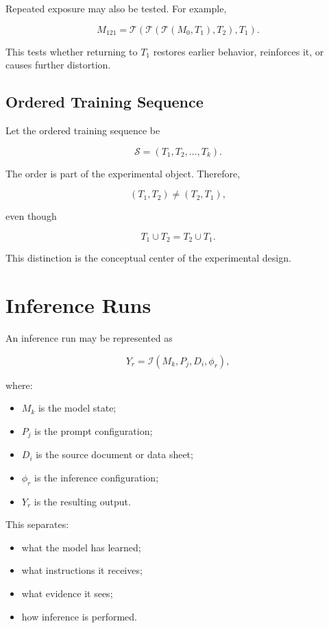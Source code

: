 \documentclass[11pt]{report}
\newcommand{\Tcal}{\mathcal{T}}
\newcommand{\Ical}{\mathcal{I}}
\begin{document}
Repeated exposure may also be tested. For example,

\[
M_{121}
=
\Tcal\left(
\Tcal\left(
\Tcal(M_0,T_1),T_2
\right),T_1
\right).
\]

This tests whether returning to $T_1$ restores earlier behavior, reinforces it, or causes further distortion.

\section{Ordered Training Sequence}

Let the ordered training sequence be

\[
\mathcal{S}=(T_1,T_2,\ldots,T_k).
\]

The order is part of the experimental object. Therefore,

\[
(T_1,T_2)\ne(T_2,T_1),
\]

even though

\[
T_1\cup T_2=T_2\cup T_1.
\]

This distinction is the conceptual center of the experimental design.

\chapter{Inference Runs}

An inference run may be represented as

\[
Y_r
=
\Ical(M_k,P_j,D_i,\phi_r),
\]

where:

\begin{itemize}
  \item $M_k$ is the model state;
  \item $P_j$ is the prompt configuration;
  \item $D_i$ is the source document or data sheet;
  \item $\phi_r$ is the inference configuration;
  \item $Y_r$ is the resulting output.
\end{itemize}

This separates:

\begin{itemize}
  \item what the model has learned;
  \item what instructions it receives;
  \item what evidence it sees;
  \item how inference is performed.
\end{itemize}
\end{document}
